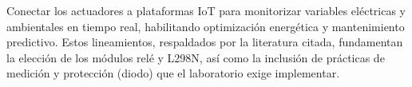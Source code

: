 Conectar los actuadores a plataformas IoT para monitorizar variables eléctricas y ambientales en tiempo real, habilitando optimización energética y mantenimiento predictivo. Estos lineamientos, respaldados por la literatura citada, fundamentan la elección de los módulos relé y L298N, así como la inclusión de prácticas de medición y protección (diodo) que el laboratorio exige implementar.





